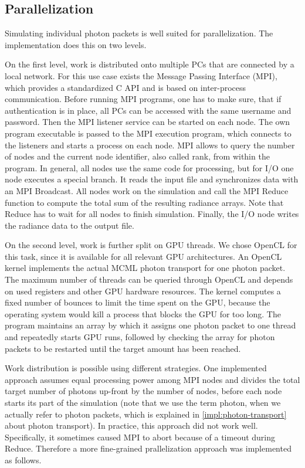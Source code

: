\documentclass[]{article}
\begin{document}
\subsection{Parallelization}

Simulating individual photon packets is well suited for parallelization. The implementation does this on two levels.

On the first level, work is distributed onto multiple PCs that are connected by a local network. For this use case exists the Message Passing Interface (MPI), which provides a standardized C API and is based on inter-process communication. Before running MPI programs, one has to make sure, that if authentication is in place, all PCs can be accessed with the same username and password. Then the MPI listener service can be started on each node. The own program executable is passed to the MPI execution program, which connects to the listeners and starts a process on each node. MPI allows to query the number of nodes and the current node identifier, also called rank, from within the program. In general, all nodes use the same code for processing, but for I/O one node executes a special branch. It reads the input file and synchronizes data with an MPI Broadcast. All nodes work on the simulation and call the MPI Reduce function to compute the total sum of the resulting radiance arrays. Note that Reduce has to wait for all nodes to finish simulation. Finally, the I/O node writes the radiance data to the output file.

On the second level, work is further split on GPU threads. We chose OpenCL for this task, since it is available for all relevant GPU architectures. An OpenCL kernel implements the actual MCML photon transport for one photon packet. The maximum number of threads can be queried through OpenCL and depends on used registers and other GPU hardware resources. The kernel computes a fixed number of bounces to limit the time spent on the GPU, because the operating system would kill a process that blocks the GPU for too long. The program maintains an array by which it assigns one photon packet to one thread and repeatedly starts GPU runs, followed by checking the array for photon packets to be restarted until the target amount has been reached.

Work distribution is possible using different strategies. One implemented approach assumes equal processing power among MPI nodes and divides the total target number of photons up-front by the number of nodes, before each node starts its part of the simulation (note that we use the term photon, when we actually refer to photon packets, which is explained in \autoref{impl:photon-transport} about photon transport). In practice, this approach did not work well. Specifically, it sometimes caused MPI to abort because of a timeout during Reduce. Therefore a more fine-grained prallelization approach was implemented as follows.
\end{document}
